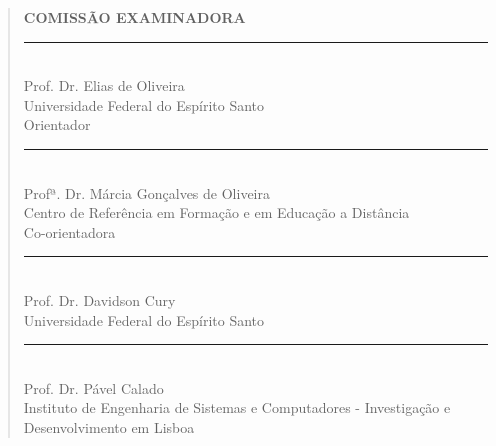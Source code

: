\begin{quote}
{
\bfseries
\fontsize{16}{18}\selectfont
\hspace{3cm}COMISSÃO EXAMINADORA
}
\vspace{0.8cm}
{
\fontsize{11}{13}\selectfont

\hspace*{3cm}\rule{105mm}{0.2mm}\\
\hspace*{3cm}Prof. Dr. Elias de Oliveira\\
\hspace*{3cm}Universidade Federal do Espírito Santo \\
\hspace*{3cm}Orientador\\
\hspace*{3cm}\rule{105mm}{0.2mm}\\
\hspace*{3cm}Profª. Dr. Márcia Gonçalves de Oliveira\\
\hspace*{3cm}Centro de Referência em Formação e em Educação a Distância\\
\hspace*{3cm}Co-orientadora\\ 
\hspace*{3cm}\rule{105mm}{0.2mm}\\
\hspace*{3cm}Prof. Dr. Davidson Cury\\
\hspace*{3cm}Universidade Federal do Espírito Santo\\[0.5cm]
\hspace*{3cm}\rule{105mm}{0.2mm}\\
\hspace*{3cm}Prof. Dr. Pável Calado\\
\hspace*{3cm}Instituto de Engenharia de Sistemas e Computadores - Investigação \hspace*{3cm}e Desenvolvimento em Lisboa\\[1ex]

}
\end{quote}













